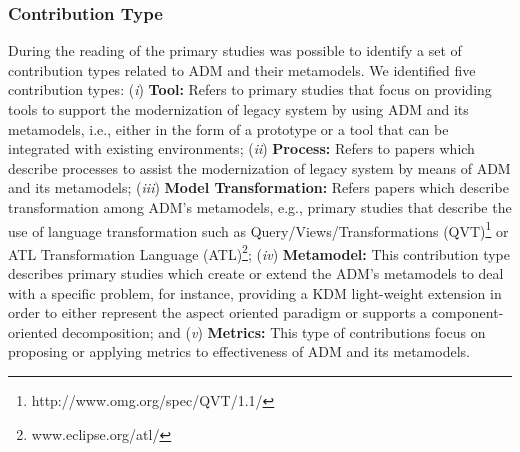

\subsubsection{Contribution Type}


During the reading of the primary studies was possible to identify a set of contribution types related to ADM and their metamodels. We identified five contribution types: (\textit{i}) \textbf{Tool:} Refers to primary studies that focus on providing tools to support the modernization of legacy system by using ADM and its metamodels, i.e., either in the form of a prototype or a tool that can be integrated with existing environments; (\textit{ii}) \textbf{Process:} Refers to papers which describe processes to assist the modernization of legacy system by means of ADM and its metamodels; (\textit{iii}) \textbf{Model Transformation:} Refers papers which describe transformation among ADM's metamodels, e.g., primary studies that describe the use of language transformation such as Query/Views/Transformations (QVT)\footnote{http://www.omg.org/spec/QVT/1.1/} or ATL Transformation Language (ATL)\footnote{www.eclipse.org/atl/}; (\textit{iv}) \textbf{Metamodel:} This contribution type describes primary studies which create or extend the ADM's metamodels to deal with a specific problem, for instance, providing a KDM light-weight extension in order to either represent the aspect oriented paradigm or supports a component-oriented decomposition; and (\textit{v}) \textbf{Metrics:} This type of contributions focus on proposing or applying metrics to effectiveness of ADM and its metamodels.







